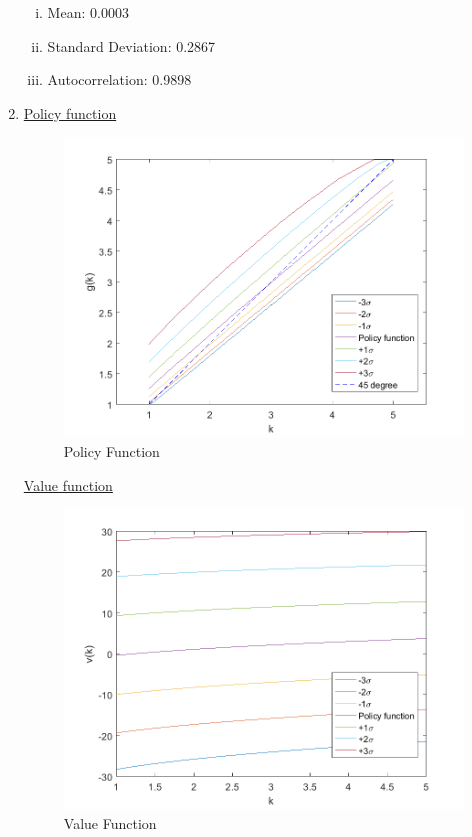 \documentclass[12pt]{article}
\theoremstyle{definition}
\begin{document}
\begin{enumerate}[1.]
\begin{enumerate}[(i)]
	\item Mean: 0.0003    
	\item Standard Deviation: 0.2867    
	\item Autocorrelation: 0.9898
\end{enumerate}


\item 

\underline{Policy function}
\begin{figure}[H]
	\centering
	\includegraphics[width=\linewidth]{plot_policy}
	\caption{Policy Function}
	\label{fig:plotpolicy}
\end{figure}

\underline{Value function}
\begin{figure}[H]
	\centering
	\includegraphics[width=\linewidth]{plot_value}
	\caption{Value Function}
	\label{fig:plotvalue}
\end{figure}


\end{enumerate}
\end{document}
